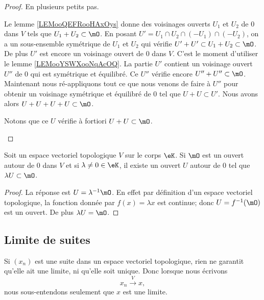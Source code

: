 \begin{proof}
	En plusieurs petits pas.
	\begin{subproof}
		Le lemme \ref{LEMooQEFRooHAxOys} donne des voisinages ouverts \( U_1\) et \( U_2\) de \( 0\) dans \( V\) tels que \( U_1+U_2\subset \mO\).
		\spitem[Symétrique]
		En posant \( U' = U_1 \cap U_2 \cap (-U_1) \cap (-U_2) \), on a un sous-ensemble symétrique de \( U_1\) et \(U_2\) qui vérifie \( U' + U'\subset U_1+U_2\subset \mO \). De plus \( U'\) est encore un voisinage ouvert de \( 0\) dans \( V\).
		\spitem[équilibré]
		C'est le moment d'utiliser le lemme \ref{LEMooYSWXooNqAcOQ}. La partie \( U'\) contient un voisinage ouvert \( U''\) de \( 0\) qui est symétrique et équilibré. Ce \( U''\) vérifie encore \( U''+U''\subset \mO\).
		\spitem[En \( 4\) parties]
		Maintenant nous ré-appliquons tout ce que nous venons de faire à \( U''\) pour obtenir un voisinage symétrique et équilibré de \( 0\) tel que \( U+U\subset U'\). Nous avons alors \( U+U+U+U\subset \mO\).

		Notons que ce \( U\) vérifie à fortiori \( U+U\subset \mO\).
	\end{subproof}
\end{proof}


\begin{lemma}            \label{LEMooEZIYooBBxdJj}
	Soit un espace vectoriel topologique \( V\) sur le corps \( \eK\). Si \( \mO\) est un ouvert autour de \( 0\) dans \( V\) et si \( \lambda\neq 0\in \eK\), il existe un ouvert \( U\) autour de \( 0\) tel que \( \lambda U\subset \mO\).
\end{lemma}

\begin{proof}
	La réponse est \( U=\lambda^{-1}\mO\). En effet par définition d'un espace vectoriel topologique, la fonction donnée par \( f(x)=\lambda x  \) est continue; donc \( U=f^{-1}(\mO)\) est un ouvert. De plus \( \lambda U=\mO\).
\end{proof}


\subsection{Limite de suites}

Si \( (x_n)\) est une suite dans un espace vectoriel topologique, rien ne garantit qu'elle ait une limite, ni qu'elle soit unique. Donc lorsque nous écrivons
\begin{equation}
	x_n\stackrel{V}{\longrightarrow}x,
\end{equation}
nous sous-entendons seulement que \( x\) est une limite.

